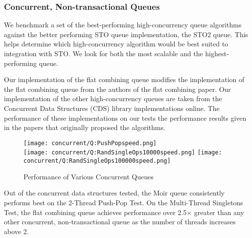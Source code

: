\subsubsection{Concurrent, Non-transactional Queues}

We benchmark a set of the best-performing high-concurrency queue algorithms against the better performing STO queue implementation, the STO2 queue. This helps determine which high-concurrency algorithm would be best suited to integration with STO. We look for both the most scalable and the highest-performing queue.
 
 Our implementation of the flat combining queue modifies the implementation of the flat combining queue from the authors of the flat combining paper\cite{flatcombining}. Our implementation of the other high-concurrency queues are taken from the Concurrent Data Structures (CDS) library implementations online\cite{libcds}. The performance of these implementations on our tests the performance results given in the papers that originally proposed the algorithms.

\begin{figure}[h!]
\centering
    \texttt{[image: concurrent/Q:PushPopspeed.png]}\\
    \texttt{[image: concurrent/Q:RandSingleOps10000speed.png]}
    \texttt{[image: concurrent/Q:RandSingleOps100000speed.png]}
\caption{Performance of Various Concurrent Queues}
\label{fig:concurrent_queues}
\end{figure}

Out of the concurrent data structures tested, the Moir queue\cite{queue2} consistently performs best on the 2-Thread Push-Pop Test. On the Multi-Thread Singletons Test, the flat combining queue achieves performance over 2.5$\times$ greater than any other concurrent, non-transactional queue as the number of threads increases above 2.

